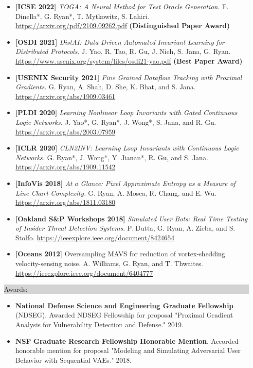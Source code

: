 \documentclass{article} %
\newcommand{\rsection}[1]{
  \hspace{-0.4cm}\vspace{0.1cm}
\colorbox{lightgrey}{
\begin{minipage}{1.07\linewidth}
\vspace{0.22cm}
\fontsize{14pt}{16pt}\selectfont #1
\vspace{0.12cm}
\end{minipage}
}
\vspace*{-0.1cm}
}
\begin{document}
\begin{minipage}{1.01\linewidth}
\begin{itemize}[label={},itemindent=-2em,leftmargin=2em, parsep=4pt]
  \item {\bf [ICSE 2022]}
    \textit{TOGA: A Neural Method for Test Oracle Generation.}
    E. Dinella*, G. Ryan*, T. Mytkowitz, S. Lahiri. \url{https://arxiv.org/pdf/2109.09262.pdf} \textbf{(Distinguished Paper Award)}
  \item {\bf [OSDI 2021]}
    \textit{DistAI: Data-Driven Automated Invariant Learning for Distributed Protocols.}
    J. Yao, R. Tao, R. Gu, J. Nieh, S. Jana, G. Ryan. \url{https://www.usenix.org/system/files/osdi21-yao.pdf} \textbf{(Best Paper Award)}
  \item {\bf [USENIX Security 2021]}
    \textit{Fine Grained Dataflow Tracking with Proximal Gradients.}
    G. Ryan, A. Shah, D. She, K. Bhat, and S. Jana. \url{https://arxiv.org/abs/1909.03461}
  \item {\bf [PLDI 2020]}
    \textit{Learning Nonlinear Loop Invariants with Gated Continuous Logic Networks.}
    J. Yao*, G. Ryan*, J. Wong*, S. Jana, and R. Gu. \url{https://arxiv.org/abs/2003.07959}
  \item {\bf [ICLR 2020]}
    \textit{CLN2INV: Learning Loop Invariants with Continuous Logic Networks.}
    G. Ryan*, J. Wong*, Y. Jianan*, R. Gu, and S. Jana. \url{https://arxiv.org/abs/1909.11542}
  \item {\bf [InfoVis 2018]}
    \textit{At a Glance: Pixel Approximate Entropy as a Measure of Line Chart Complexity.}
    G. Ryan, A. Mosca, R. Chang, and E. Wu. \url{https://arxiv.org/abs/1811.03180}
  \item  {\bf [Oakland S\&P Workshops 2018]}
    \textit{Simulated User Bots: Real Time Testing of Insider Threat Detection Systems.}
    P. Dutta, G. Ryan, A. Zieba, and S. Stolfo. \url{https://ieeexplore.ieee.org/document/8424654}
  \item  {\bf [Oceans 2012]} \textrm{\fontsize{11pt}{12pt}\selectfont Oversampling MAVS for reduction of vortex-shedding velocity-sensing noise.} A. Williams, G. Ryan, and T. Thwaites. \url{https://ieeexplore.ieee.org/document/6404777}
\end{itemize}
\end{minipage}


\rsection{Awards:}
\hspace*{-0.1cm}
\begin{minipage}{1.01\linewidth}
\begin{itemize}[label={},itemindent=-2em,leftmargin=2em, parsep=4pt]
  \item {\bf National Defense Science and Engineering Graduate Fellowship} (NDSEG). Awarded NDSEG Fellowship for proposal "Proximal Gradient Analysis for Vulnerability Detection and Defense." 2019.
  \item {\bf NSF Graduate Research Fellowship Honorable Mention}. Accorded honorable mention for proposal "Modeling and Simulating Adversarial User Behavior with Sequential VAEs." 2018.
  \end{itemize}
\end{minipage}
\end{document}
